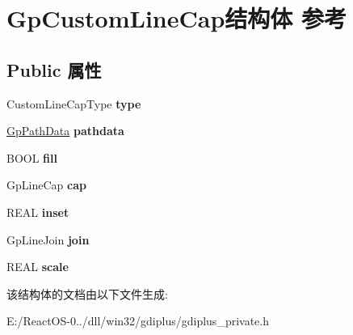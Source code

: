 \hypertarget{struct_gp_custom_line_cap}{}\section{Gp\+Custom\+Line\+Cap结构体 参考}
\label{struct_gp_custom_line_cap}
\subsection*{Public 属性}
\begin{DoxyCompactItemize}
\item 
\mbox{\label{struct_gp_custom_line_cap_a7bc4444036d84345ee5ffaf92b467770}} 
Custom\+Line\+Cap\+Type {\bfseries type}
\item 
\mbox{\label{struct_gp_custom_line_cap_a4f3f8e8d8cd4b7499f255a76a72f7af7}} 
\hyperlink{struct_path_data}{Gp\+Path\+Data} {\bfseries pathdata}
\item 
\mbox{\label{struct_gp_custom_line_cap_a369085b3f4f7b59db611de9377d3d4a5}} 
B\+O\+OL {\bfseries fill}
\item 
\mbox{\label{struct_gp_custom_line_cap_ae74f6b2d26a740598f22e1812fe78c72}} 
Gp\+Line\+Cap {\bfseries cap}
\item 
\mbox{\label{struct_gp_custom_line_cap_aa03f8210fd38a13a0e342ca5afc10708}} 
R\+E\+AL {\bfseries inset}
\item 
\mbox{\label{struct_gp_custom_line_cap_a2ef5cacfb75f874ba2f8b62fdb5803b4}} 
Gp\+Line\+Join {\bfseries join}
\item 
\mbox{\label{struct_gp_custom_line_cap_a80317026484d718858c2f82f35ac4e65}} 
R\+E\+AL {\bfseries scale}
\end{DoxyCompactItemize}


该结构体的文档由以下文件生成\+:\begin{DoxyCompactItemize}
\item 
E\+:/\+React\+O\+S-\/0../dll/win32/gdiplus/gdiplus\+\_\+private.\+h\end{DoxyCompactItemize}
